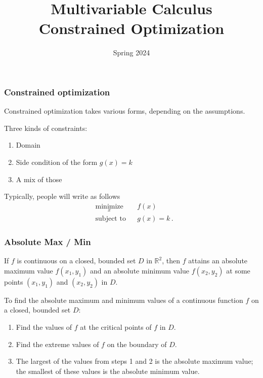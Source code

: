 \documentclass[aspectratio=169]{beamer}
\title{ Multivariable Calculus \\  Constrained Optimization }
\date{Spring 2024}
\begin{document}
\maketitle

\begin{frame}
    \frametitle{Constrained optimization}
Constrained optimization takes various forms, depending on the assumptions.

Three kinds of constraints:

\begin{enumerate}
    \item Domain
    \item Side condition of the form $g(x) = k$
    \item A mix of those
\end{enumerate}


\end{frame}


\begin{frame}

Typically, people will write as follows
\begin{equation*}
\begin{aligned}
& \underset{x}{\text{minimize}}
& & f(x) \\
& \text{subject to}
& & 
g(x) = k \,.
\end{aligned}
\end{equation*}
\end{frame}


\begin{frame}
    \frametitle{Absolute Max / Min}
    \begin{theorem}
        If $f$ is continuous on a closed, bounded set $D$ in $\mathbb{R}^2$, then $f$ attains an absolute maximum value $f(x_1, y_1)$ and an absolute minimum value $f(x_2, y_2)$ at some points $(x_1, y_1)$ and $(x_2, y_2)$ in $D$.
    \end{theorem}
\end{frame}

\begin{frame}
    To find the absolute maximum and minimum values of a continuous function $f$ on a closed, bounded set $D$:
\begin{enumerate}
    \item Find the values of $f$ at the critical points of $f$ in $D$.
    \item Find the extreme values of $f$ on the boundary of $D$.
    \item The largest of the values from steps 1 and 2 is the absolute maximum value; the smallest of these values is the absolute minimum value.
\end{enumerate}
\end{frame}
\end{document}
